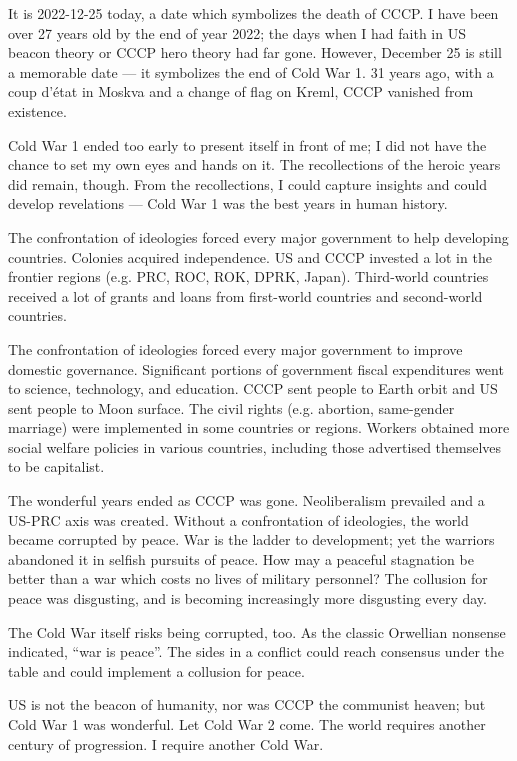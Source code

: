 
\begin{multicols*}{2}
	It is 2022-12-25 today, a date which symbolizes the death of CCCP.
	I have been over 27 years old by the end of year 2022;
	the days when I had faith in US beacon theory or CCCP hero theory had far gone.
	However, December 25 is still a memorable date --- it symbolizes the end of Cold War 1.
	31 years ago, with a coup d'\'etat in Moskva and a change of flag on Kreml, CCCP vanished from existence.

	Cold War 1 ended too early to present itself in front of me;
	I did not have the chance to set my own eyes and hands on it.
	The recollections of the heroic years did remain, though.
	From the recollections, I could capture insights and could develop revelations ---
	Cold War 1 was the best years in human history.

	The confrontation of ideologies forced every major government to help developing countries.
	Colonies acquired independence.
	US and CCCP invested a lot in the frontier regions (e.g. PRC, ROC, ROK, DPRK, Japan).
	Third-world countries received a lot of grants and loans from first-world countries and second-world countries.

	The confrontation of ideologies forced every major government to improve domestic governance.
	Significant portions of government fiscal expenditures went to science, technology, and education.
	CCCP sent people to Earth orbit and US sent people to Moon surface.
	The civil rights (e.g. abortion, same-gender marriage) were implemented in some countries or regions.
	Workers obtained more social welfare policies in various countries, including those advertised themselves to be capitalist.

	The wonderful years ended as CCCP was gone.
	Neoliberalism prevailed and a US-PRC axis was created.
	Without a confrontation of ideologies, the world became corrupted by peace.
	War is the ladder to development; yet the warriors abandoned it in selfish pursuits of peace.
	How may a peaceful stagnation be better than a war which costs no lives of military personnel?
	The collusion for peace was disgusting, and is becoming increasingly more disgusting every day.

    The Cold War itself risks being corrupted, too.
    As the classic Orwellian nonsense indicated, ``war is peace''.
    The sides in a conflict could reach consensus under the table and could implement a collusion for peace.

	US is not the beacon of humanity, nor was CCCP the communist heaven; but Cold War 1 was wonderful.
	Let Cold War 2 come.
	The world requires another century of progression.
	I require another Cold War.
\end{multicols*}
